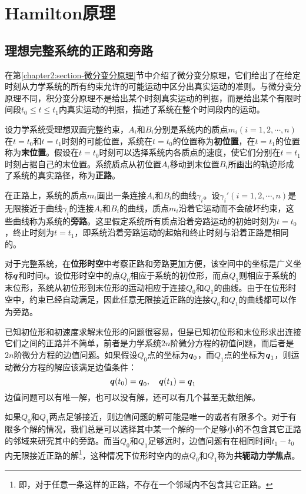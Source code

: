 \section{Hamilton原理}

\subsection{理想完整系统的正路和旁路}

在第\ref{chapter2:section-微分变分原理}节中介绍了微分变分原理，它们给出了在给定时刻从力学系统的所有约束允许的可能运动中区分出真实运动的准则。与微分变分原理不同，积分变分原理不是给出某个时刻真实运动的判据，而是给出某个有限时间段$t_0\leqslant t\leqslant t_1$内真实运动的判据，描述了系统在整个时间段内的运动。

设力学系统受理想双面完整约束，$A_i$和$B_i$分别是系统内的质点$m_i(i=1,2,\cdots,n)$在$t=t_0$和$t=t_1$时刻的可能位置，系统在$t=t_0$的位置称为{\bf 初位置}，在$t=t_1$的位置称为{\bf 末位置}。假设在$t=t_0$时刻可以选择系统内各质点的速度，使它们分别在$t=t_1$时刻占据自己的末位置。系统质点从初位置$A_i$移动到末位置$B_i$所画出的轨迹形成了系统的真实路径，称为{\bf 正路}。

在正路上，系统的质点$m_i$画出一条连接$A_i$和$B_i$的曲线$\gamma_i$。设$\gamma_i'(i=1,2,\cdots,n)$是无限接近于曲线$\gamma_i$的连接$A_i$和$B_i$的曲线，质点$m_i$沿着它运动而不会破坏约束，这些曲线称为系统的{\bf 旁路}。这里假定系统所有质点沿着旁路运动的初始时刻为$t=t_0$，终止时刻为$t=t_1$，即系统沿着旁路运动的起始和终止时刻与沿着正路是相同的。

对于完整系统，在{\bf 位形时空}中考察正路和旁路更加方便，该空间中的坐标是广义坐标$\boldsymbol{q}$和时间$t$。设位形时空中的点$Q_0$相应于系统的初位形，而点$Q_1$则相应于系统的末位形，系统从初位形到末位形的运动相应于连接$Q_0$和$Q_1$的曲线。由于在位形时空中，约束已经自动满足，因此任意无限接近正路的连接$Q_0$和$Q_1$的曲线都可以作为旁路。

已知初位形和初速度求解末位形的问题很容易，但是已知初位形和末位形求出连接它们之间的正路并不简单，前者是力学系统$2n$阶微分方程的初值问题，而后者是$2n$阶微分方程的边值问题。如果假设$Q_0$点的坐标为$\boldsymbol{q}_0$，而$Q_1$点的坐标为$\boldsymbol{q}_1$，则运动微分方程的解应该满足边值条件：
\begin{equation*}
	\boldsymbol{q}(t_0) = \boldsymbol{q}_0,\quad \boldsymbol{q}(t_1) = \boldsymbol{q}_1
\end{equation*}
边值问题可以有唯一解，也可以没有解，还可以有几个甚至无数组解。

如果$Q_0$和$Q_1$两点足够接近，则边值问题的解可能是唯一的或者有限多个。对于有限多个解的情况，我们总是可以选择其中某一个解的一个足够小的不包含其它正路的邻域来研究其中的旁路。而当$Q_0$和$Q_1$足够远时，边值问题有在相同时间$t_1-t_0$内无限接近正路的解\footnote{即，对于任意一条这样的正路，不存在一个邻域内不包含其它正路。}，这种情况下位形时空内的点$Q_0$和$Q_1$称为{\bf 共轭动力学焦点}。

